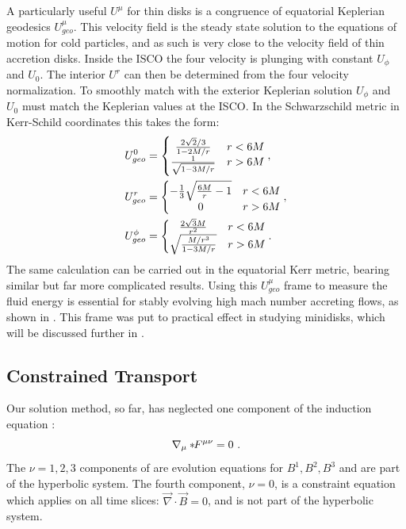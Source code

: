 A particularly useful $U^\mu$ for thin disks is a congruence of equatorial Keplerian geodesics $U^\mu_{geo}$.  This velocity field is the steady state solution to the equations of motion for cold particles, and as such is very close to the velocity field of thin accretion disks.  Inside the ISCO the four velocity is plunging with constant $U_\phi$ and $U_0$.  The interior $U^r$ can then be determined from the four velocity normalization. To smoothly match with the exterior Keplerian solution $U_\phi$ and $U_0$ must match the Keplerian values at the ISCO.  In the Schwarzschild metric in Kerr-Schild coordinates this takes the form:
\begin{align}
	U^0_{geo} &= \left \{ \begin{matrix} \frac{2\sqrt{2}/3}{1-2M/r} & r < 6M \\
						\frac{1}{\sqrt{1-3M/r}} & r > 6M \end{matrix} \right . , \nonumber \\
	U^r_{geo} &= \left \{ \begin{matrix} -\frac{1}{3}\sqrt{\frac{6M}{r}-1} & r < 6M \\
						0 & r > 6M \end{matrix} \right . , \nonumber \\
	U^\phi_{geo} &= \left \{ \begin{matrix}  \frac{2 \sqrt{3} M}{r^2} & r < 6M \\
						\sqrt{\frac{M/r^3}{1-3M/r}} & r > 6M \end{matrix} \right . . \eqlabel{Ugeo}
\end{align}
The same calculation can be carried out in the equatorial Kerr metric, bearing similar but far more complicated results.  Using this $U^\mu_{geo}$ frame to measure the fluid energy is essential for stably evolving high mach number accreting flows, as shown in .  This frame was put to practical effect in studying minidisks, which will be discussed further in .

\subsection{Constrained Transport}

Our solution method, so far, has neglected one component of the induction equation :
\begin{equation}
	\nabla_\mu *\!\! F^{\mu\nu} = 0\ .
\end{equation}
The $\nu=1,2,3$ components of  are evolution equations for $B^1, B^2, B^3$ and are part of the hyperbolic system.  The fourth component, $\nu=0$, is a constraint equation which applies on all time slices: $\vec{\nabla}\cdot \vec{B} = 0$, and is not part of the hyperbolic system.

